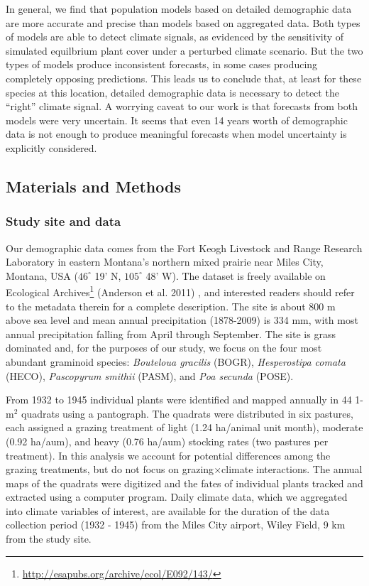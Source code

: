 \documentclass[12pt,]{article}
\let\rmarkdownfootnote\footnote%
\def\footnote{\protect\rmarkdownfootnote}
\begin{document}
In general, we find that population models based on detailed demographic
data are more accurate and precise than models based on aggregated data.
Both types of models are able to detect climate signals, as evidenced by
the sensitivity of simulated equilbrium plant cover under a perturbed
climate scenario. But the two types of models produce inconsistent
forecasts, in some cases producing completely opposing predictions. This
leads us to conclude that, at least for these species at this location,
detailed demographic data is necessary to detect the ``right'' climate
signal. A worrying caveat to our work is that forecasts from both models
were very uncertain. It seems that even 14 years worth of demographic
data is not enough to produce meaningful forecasts when model
uncertainty is explicitly considered.

\subsection{Materials and Methods}\label{materials-and-methods}

\subsubsection{Study site and data}\label{study-site-and-data}

Our demographic data comes from the Fort Keogh Livestock and Range
Research Laboratory in eastern Montana's northern mixed prairie near
Miles City, Montana, USA (\(46^{\circ}\) 19' N, \(105^{\circ}\) 48' W).
The dataset is freely available on Ecological Archives\footnote{\url{http://esapubs.org/archive/ecol/E092/143/}}
(Anderson et al. 2011) , and interested readers should refer to the
metadata therein for a complete description. The site is about 800 m
above sea level and mean annual precipitation (1878-2009) is 334 mm,
with most annual precipitation falling from April through September. The
site is grass dominated and, for the purposes of our study, we focus on
the four most abundant graminoid species: \emph{Bouteloua gracilis}
(BOGR), \emph{Hesperostipa comata} (HECO), \emph{Pascopyrum smithii}
(PASM), and \emph{Poa secunda} (POSE).

From 1932 to 1945 individual plants were identified and mapped annually
in 44 1-\(\text{m}^2\) quadrats using a pantograph. The quadrats were
distributed in six pastures, each assigned a grazing treatment of light
(1.24 ha/animal unit month), moderate (0.92 ha/aum), and heavy (0.76
ha/aum) stocking rates (two pastures per treatment). In this analysis we
account for potential differences among the grazing treatments, but do
not focus on grazing\(\times\)climate interactions. The annual maps of
the quadrats were digitized and the fates of individual plants tracked
and extracted using a computer program. Daily climate data, which we
aggregated into climate variables of interest, are available for the
duration of the data collection period (1932 - 1945) from the Miles City
airport, Wiley Field, 9 km from the study site.
\end{document}
